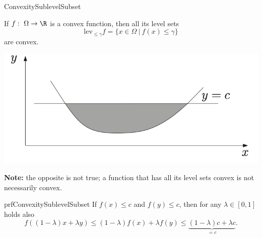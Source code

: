 
\begin{theo}{ConvexitySublevelSubset}
    \vspace*{-0.7cm}
    \begin{minipage}{0.56\textwidth}
        If $f: \ \Omega \rightarrow \R$ is a convex function, then all its level sets 
        \begin{equation*}
            \text{lev}_{\leq \gamma}f = \{x \in \Omega \ | \ f(x) \leq \gamma\}
        \end{equation*}
        are convex.
    \end{minipage}
    \begin{minipage}{0.42\textwidth}
        \begin{center}
            \vspace*{0.2cm}
            \includegraphics[scale = 0.495]{Images/Fundamental/ConvexSubset.png}
        \end{center}
    \end{minipage}

    \textbf{Note:} the opposite is not true; a function that has all its level sets convex is not necessarily convex.
\end{theo}

\begin{prf}{prfConvexitySublevelSubset}
    If $f(x) \leq c$ and $f(y) \leq c$, then for any $\lambda \in [0,1]$ holds also 
    \begin{equation*}
        f((1-\lambda)x + \lambda y) \leq (1-\lambda)f(x) + \lambda f(y) \leq \underset{= c}{\underbrace{(1-\lambda)c + \lambda c}}.
    \end{equation*}
    \vspace*{-1cm}
\end{prf}


